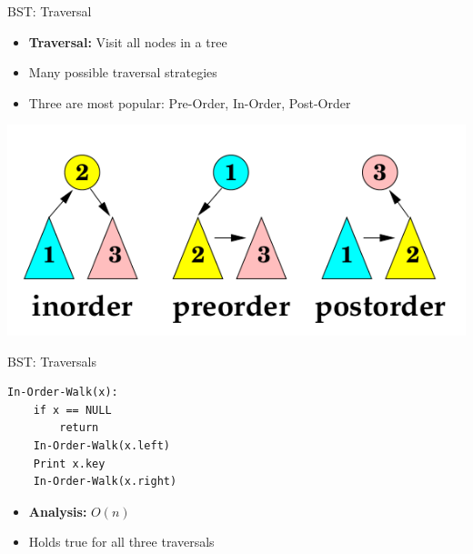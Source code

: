 \documentclass{beamer}
\begin{document}
\begin{frame}{BST: Traversal}
    \begin{itemize}
        \item {\bf Traversal:} Visit all nodes in a tree
        \item Many possible traversal strategies
        \item Three are most popular:  Pre-Order, In-Order, Post-Order
    \end{itemize}
    \begin{center}
        \includegraphics[scale=0.5]{bstTraversals.png}
    \end{center}
\end{frame}


\begin{frame}[fragile]{BST: Traversals}
\begin{verbatim}
In-Order-Walk(x):
    if x == NULL
        return
    In-Order-Walk(x.left)
    Print x.key
    In-Order-Walk(x.right)
\end{verbatim}
    \begin{itemize}
        \item {\bf Analysis:} \pause $O(n)$
        \item Holds true for all three traversals
    \end{itemize}
\end{frame}
\end{document}
